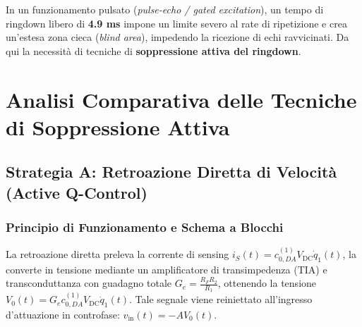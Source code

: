 \documentclass[11pt,a4paper]{article}
\begin{document}
\begin{warnbox}
In un funzionamento pulsato (\emph{pulse-echo / gated excitation}), un tempo di ringdown libero di \textbf{4.9 ms} impone un limite severo al rate di ripetizione e crea un'estesa zona cieca (\emph{blind area}), impedendo la ricezione di echi ravvicinati. Da qui la necessità di tecniche di \textbf{soppressione attiva del ringdown}.
\end{warnbox}

\newpage

\section{Analisi Comparativa delle Tecniche di Soppressione Attiva}

\subsection{Strategia A: Retroazione Diretta di Velocità (Active Q-Control)}

\subsubsection{Principio di Funzionamento e Schema a Blocchi}
La retroazione diretta preleva la corrente di sensing $i_S(t) = c_{0,DA}^{(1)} V_{\text{DC}} \dot{q}_1(t)$, la converte in tensione mediante un amplificatore di transimpedenza (TIA) e transconduttanza con guadagno totale $G_e = \frac{R_F R_2}{R_1}$, ottenendo la tensione $V_0(t) = G_e c_{0,DA}^{(1)} V_{\text{DC}} \dot{q}_1(t)$.
Tale segnale viene reiniettato all'ingresso d'attuazione in controfase: $v_{\text{in}}(t) = -A V_0(t)$.

\begin{center}
\end{center}
\end{document}
